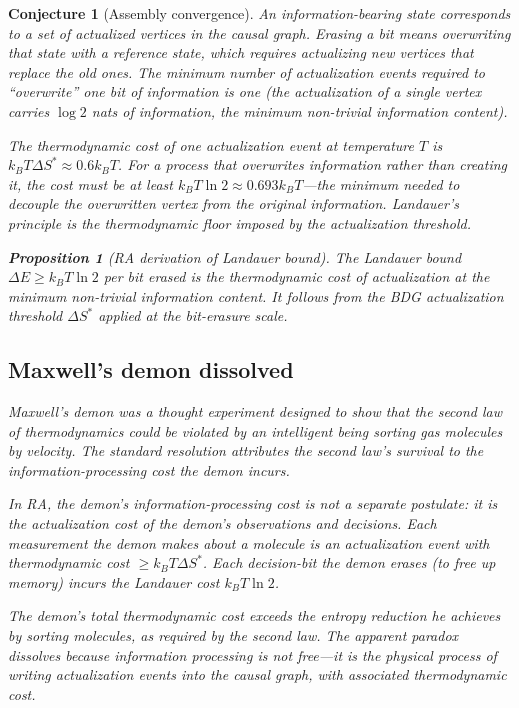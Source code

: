 \documentclass[11pt]{article}
\newtheorem{proposition}{Proposition}
\newtheorem{conjecture}{Conjecture}
\begin{document}
\begin{conjecture}[Assembly convergence]
An information-bearing state corresponds to a set of actualized vertices in the causal graph. Erasing a bit means overwriting that state with a reference state, which requires actualizing new vertices that replace the old ones. The minimum number of actualization events required to ``overwrite'' one bit of information is one (the actualization of a single vertex carries $\log 2$ nats of information, the minimum non-trivial information content).

The thermodynamic cost of one actualization event at temperature $T$ is $k_B T \Delta S^* \approx 0.6 k_B T$. For a process that overwrites information rather than creating it, the cost must be at least $k_B T \ln 2 \approx 0.693 k_B T$---the minimum needed to decouple the overwritten vertex from the original information. Landauer's principle is the thermodynamic floor imposed by the actualization threshold.

\begin{proposition}[RA derivation of Landauer bound]
\label{prop:landauer}
The Landauer bound $\Delta E \geq k_B T \ln 2$ per bit erased is the thermodynamic cost of actualization at the minimum non-trivial information content. It follows from the BDG actualization threshold $\Delta S^*$ applied at the bit-erasure scale.
\end{proposition}

\subsection{Maxwell's demon dissolved}
\label{sec:maxwell}

Maxwell's demon was a thought experiment designed to show that the second law of thermodynamics could be violated by an intelligent being sorting gas molecules by velocity. The standard resolution attributes the second law's survival to the information-processing cost the demon incurs.

In RA, the demon's information-processing cost is not a separate postulate: it is the actualization cost of the demon's observations and decisions. Each measurement the demon makes about a molecule is an actualization event with thermodynamic cost $\geq k_B T \Delta S^*$. Each decision-bit the demon erases (to free up memory) incurs the Landauer cost $k_B T \ln 2$.

The demon's total thermodynamic cost exceeds the entropy reduction he achieves by sorting molecules, as required by the second law. The apparent paradox dissolves because information processing is not free---it is the physical process of writing actualization events into the causal graph, with associated thermodynamic cost.


\end{conjecture}
\end{document}

